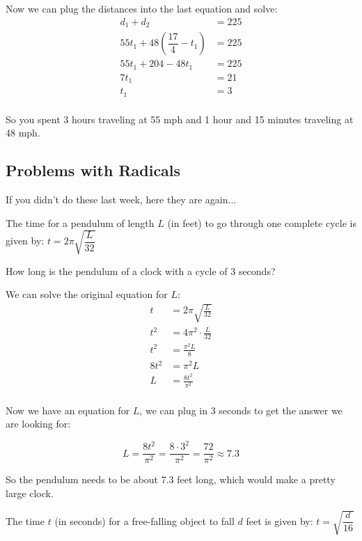 \documentclass[fleqn,addpoints]{exam}
\begin{document}
\begin{questions}
\begin{solution}
Now we can plug the distances into the last equation and solve:
\begin{align*}
  d_1 + d_2 &= 225 \\
  55t_1 + 48(\dfrac{17}{4} - t_1) &= 225 \\
  55t_1 + 204 - 48t_1 &= 225 \\
  7t_1 &= 21 \\
  t_1 &= 3 \\
\end{align*}

So you spent 3 hours traveling at 55 mph and 1 hour and 15 minutes traveling at 48 mph.

\end{solution}

\subsection{Problems with Radicals}

If you didn't do these last week, here they are again...

\question
The time for a pendulum of length $L$ (in feet) to go through one complete cycle is given by:  $t = 2 \pi \sqrt{\dfrac{L}{32}}$

How long is the pendulum of a clock with a cycle of 3 seconds?

\begin{solution}

We can solve the original equation for $L$:
\begin{align*}
  t &= 2 \pi \sqrt{\frac{L}{32}} \\
  t^2 &= 4 \pi^2 \cdot \frac{L}{32} \\
  t^2 &= \frac{\pi^2L}{8} \\
  8t^2 &= \pi^2L\\
  L &= \frac{8t^2}{\pi^2} \\
\end{align*}

Now we have an equation for $L$, we can plug in 3 seconds to get the answer we are looking for:

\[
  L = \frac{8t^2}{\pi^2} = \frac{8 \cdot 3^2}{\pi^2} = \frac{72}{\pi^2} \approx 7.3
\]
\end{solution}

So the pendulum needs to be about 7.3 feet long, which would make a pretty large clock.

\question
The time $t$ (in seconds) for a free-falling object to fall $d$ feet is given by: $t = \sqrt{\dfrac{d}{16}}$


\end{questions}
\end{document}
